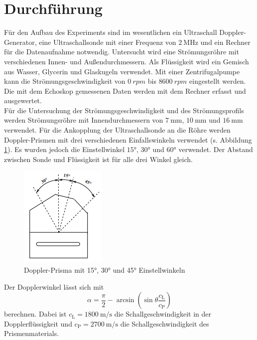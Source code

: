 \section{Durchführung}
\label{sec:Durchführung}
Für den Aufbau des Experiments sind im wesentlichen ein Ultraschall Doppler-Generator, eine Ultraschallsonde mit einer Frequenz von $\SI{2}{\mega \hertz}$
und ein Rechner für die Datenaufnahme notwendig. Untersucht wird eine Strömungsröhre mit verschiedenen Innen- und Außendurchmessern. Als Flüssigkeit wird ein Gemisch aus Wasser, Glycerin und Glaskugeln verwendet.
Mit einer Zentrifugalpumpe kann die Strömungsgeschwindigkeit von $\SI{0}{rpm}$ bis $\SI{8600}{rpm}$ eingestellt werden. Die mit dem Echoskop gemessenen Daten werden mit dem Rechner
erfasst und ausgewertet.\\
Für die Untersuchung der Strömungsgeschwindigkeit und des Strömungsprofils werden Strömungsröhre mit Innendurchmessern von $\SI{7}{\milli\metre}$, $\SI{10}{\milli\metre}$ und $\SI{16}{\milli\metre}$ verwendet.
Für die Ankopplung der Ultraschallsonde an die Röhre werden Doppler-Prismen mit drei verschiedenen Einfallswinkeln verwendet (s. Abbildung \ref{fig:doppri}).
Es wurden jedoch die Einstellwinkel $\ang{15}$, $\ang{30}$ und $\ang{60}$ verwendet. Der Abstand zwischen Sonde und Flüssigkeit ist für alle drei Winkel gleich.
\begin{figure}
    \centering
    \includegraphics[scale=0.6]{pics/prisma.png}
    \caption{Doppler-Prisma mit 15°, 30° und 45° Einstellwinkeln \cite{v903}}
    \label{fig:doppri}
  \end{figure}
  Der Dopplerwinkel lässt sich mit
  \begin{equation}
    \alpha= \frac{\pi}{2} - \arcsin\left(\sin \theta \frac{c_\text{L}}{c_\text{P}}\right)
      \label{eqn:wink}
  \end{equation}
  berechnen. Dabei ist $c_\text{L}=\SI{1800}{\metre\per\second}$ die Schallgeschwindigkeit in der Dopplerflüssigkeit und $c_\text{P}=\SI{2700}{\metre\per\second}$ die Schallgeschwindigkeit des Prismenmaterials. \\
